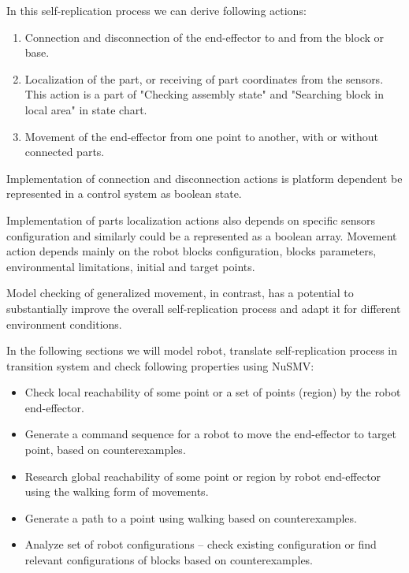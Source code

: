 In this self-replication process we can derive following actions:
\begin{enumerate}
    \item Connection and disconnection of the end-effector to and from the block or base.
    \item Localization of the part, or receiving of part coordinates from the sensors. 
        This action is a part of "Checking assembly state" and "Searching block in local area"
        in state chart.
    \item Movement of the end-effector from one point to another, with or without connected parts.
\end{enumerate}

Implementation of connection and disconnection actions is platform dependent 
be represented in a control system as boolean state.

Implementation of parts localization actions also depends on specific sensors configuration and  
similarly could be a represented as a boolean array.
Movement action depends mainly on the robot blocks configuration, blocks parameters, 
environmental limitations, initial and target points. 

Model checking of generalized movement, in contrast, has a potential to substantially 
improve the overall self-replication process and adapt it for different 
environment conditions.

In the following sections we will model robot, translate self-replication process 
in transition system and check following properties using NuSMV:
\begin{itemize}
    \item  Check local reachability of some point or a set of points (region) 
        by the robot end-effector. 
    \item Generate a command sequence for a robot to move the end-effector to
        target point, based on counterexamples.
    \item  Research global reachability of some point or region by robot end-effector 
        using the walking form of movements.
    \item Generate a path to a point using walking based on counterexamples.
    \item Analyze set of robot configurations -- check existing configuration or find 
        relevant  configurations of blocks based on counterexamples. 
\end{itemize}

%
%
%
%
%
%
%
%
%




